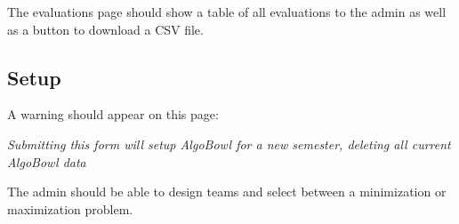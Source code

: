 \documentclass[12pt]{article}
\begin{document}
The evaluations page should show a table of all evaluations to the admin as
well as a button to download a CSV file.

\subsection{Setup}

A warning should appear on this page:

\emph{Submitting this form will setup AlgoBowl for a new semester, deleting all
current AlgoBowl data}

The admin should be able to design teams and select between a minimization or
maximization problem.
\end{document}
